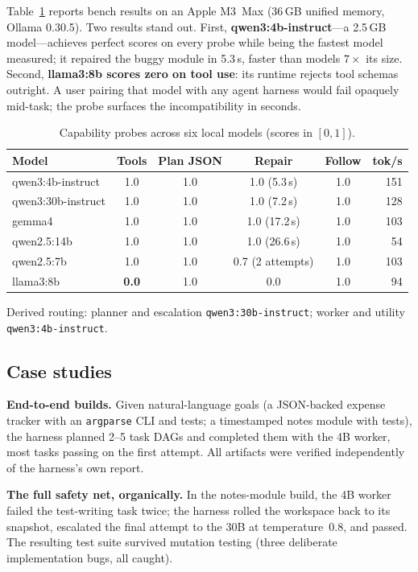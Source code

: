 \documentclass[11pt]{article}
\newcommand{\code}[1]{\texttt{#1}}
\begin{document}
Table~\ref{tab:bench} reports bench results on an Apple M3~Max (36\,GB unified memory,
Ollama 0.30.5). Two results stand out. First, \textbf{qwen3:4b-instruct}---a 2.5\,GB
model---achieves perfect scores on every probe while being the fastest model measured; it
repaired the buggy module in 5.3\,s, faster than models $7\times$ its size. Second,
\textbf{llama3:8b scores zero on tool use}: its runtime rejects tool schemas outright. A user
pairing that model with any agent harness would fail opaquely mid-task; the probe surfaces the
incompatibility in seconds.

\begin{table}[h]
\centering
\caption{Capability probes across six local models (scores in $[0,1]$).}
\label{tab:bench}
\begin{tabular}{lccccr}
\toprule
Model & Tools & Plan JSON & Repair & Follow & tok/s \\
\midrule
qwen3:4b-instruct  & 1.0 & 1.0 & 1.0 (5.3\,s)  & 1.0 & 151 \\
qwen3:30b-instruct & 1.0 & 1.0 & 1.0 (7.2\,s)  & 1.0 & 128 \\
gemma4             & 1.0 & 1.0 & 1.0 (17.2\,s) & 1.0 & 103 \\
qwen2.5:14b        & 1.0 & 1.0 & 1.0 (26.6\,s) & 1.0 & 54  \\
qwen2.5:7b         & 1.0 & 1.0 & 0.7 (2 attempts) & 1.0 & 103 \\
llama3:8b          & \textbf{0.0} & 1.0 & 0.0 & 1.0 & 94 \\
\bottomrule
\end{tabular}
\end{table}

Derived routing: planner and escalation \code{qwen3:30b-instruct}; worker and utility
\code{qwen3:4b-instruct}.

\subsection{Case studies}

\textbf{End-to-end builds.} Given natural-language goals (a JSON-backed expense tracker with an
\code{argparse} CLI and tests; a timestamped notes module with tests), the harness planned 2--5
task DAGs and completed them with the 4B worker, most tasks passing on the first attempt. All
artifacts were verified independently of the harness's own report.

\textbf{The full safety net, organically.} In the notes-module build, the 4B worker failed the
test-writing task twice; the harness rolled the workspace back to its snapshot, escalated the
final attempt to the 30B at temperature~0.8, and passed. The resulting test suite survived
mutation testing (three deliberate implementation bugs, all caught).
\end{document}
